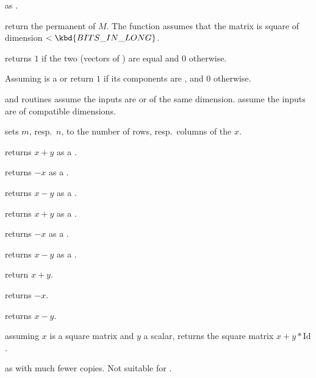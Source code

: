  as .

 return the permanent of $M$.
The function assumes that the matrix is square of dimension
$< \kbd{BITS\_IN\_LONG}$.

 returns $1$ if the two  (vectors
of ) are equal and $0$ otherwise.


 Assuming  is a 
or  return $1$ if its components are , and $0$ otherwise.





 and  routines assume the inputs are  or 
of the same dimension.  assume the inputs are  of
compatible dimensions.


 sets $m$, resp.~$n$, to
the number of rows, resp.~columns of the  $x$.

 returns $x + y$ as a .

 returns $-x$ as a .

 returns $x - y$ as a .

 returns $x + y$ as a .

 returns $-x$ as a .

 returns $x - y$ as a .

 return $x+y$.

 returns $-x$.

 returns $x-y$.

 assuming $x$ is a square matrix
and $y$ a scalar, returns the square matrix $x + y*\text{Id}$.

 as  with much
fewer copies. Not suitable for .

